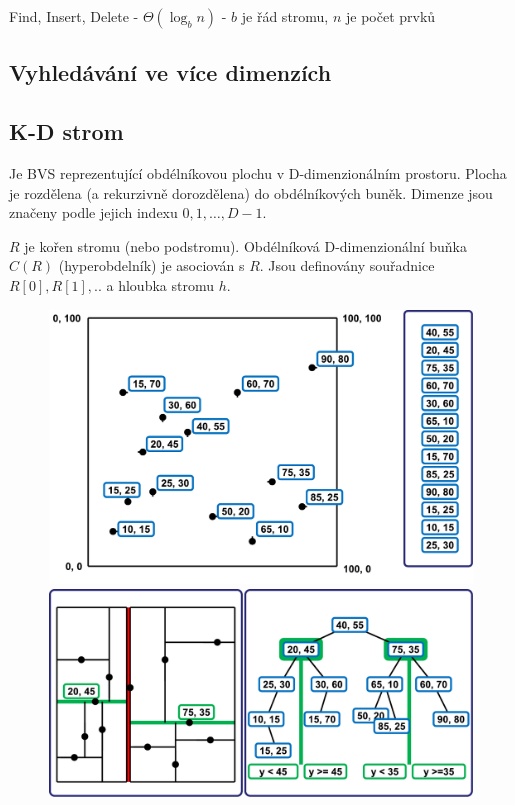 Find, Insert, Delete - $\Theta(\log_b n)$ - $b$ je řád stromu, $n$ je počet prvků


\subsection{Vyhledávání ve více dimenzích}

\subsection{K-D strom}
Je BVS reprezentující obdélníkovou plochu v D-dimenzionálním prostoru. Plocha je rozdělena (a rekurzivně dorozdělena) do obdélníkových buněk. Dimenze jsou značeny podle jejich indexu $0,1,\hdots,D-1$.

$R$ je kořen stromu (nebo podstromu). Obdélníková D-dimenzionální buňka $C(R)$ (hyperobdelník) je asociován s $R$. Jsou definovány souřadnice $R[0],R[1], ..$ a hloubka stromu $h$.

\begin{figure}[h]
    \begin{center}
        \includegraphics[width=130mm]{spolecne/03/images/kdtree01}
        \includegraphics[width=130mm]{spolecne/03/images/kdtree02}
    \end{center}
\end{figure}

